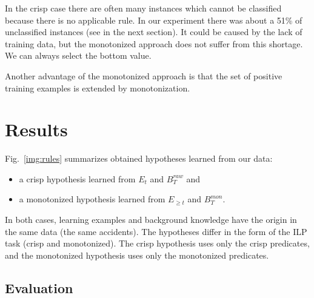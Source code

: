 In the crisp case there are often many instances which cannot be classified because there is no applicable rule. In our experiment there was about a 51\%
of unclassified instances (see in the next section). It could be caused by the lack of training data, but the monotonized approach does not suffer from this shortage. We can always select the bottom value.

Another advantage of the monotonized approach is that the set of positive training examples is extended by monotonization. 





\section{Results} \label{sec:results}

Fig.~\ref{img:rules} summarizes obtained hypotheses learned from our data: 
\begin{itemize}
	\item a crisp hypothesis learned from $E_t$ and $B^{raw}_{T}$ and
	\item a monotonized hypothesis learned from $E_{\ge t}$ and ${B}^{mon}_T$.
\end{itemize}


In both cases, learning examples and background knowledge have the origin in the same data (the same accidents). The hypotheses differ in the form of the ILP task (crisp and monotonized). The crisp hypothesis uses only the crisp predicates, and the monotonized hypothesis uses only the monotonized predicates.


\subsection{Evaluation} \label{sec:ch80_eval}

